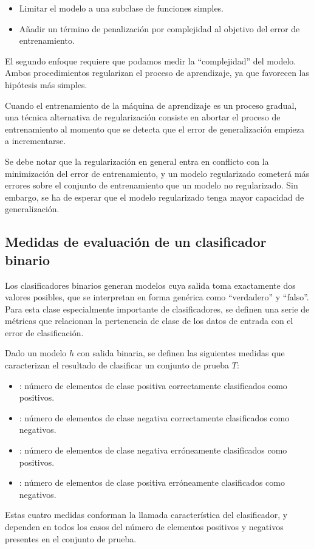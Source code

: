 \begin{itemize}
\item Limitar el modelo a una subclase de funciones simples.
\item Añadir un término de penalización por complejidad al objetivo
  del error de entrenamiento.
\end{itemize}
El segundo enfoque requiere que podamos medir la ``complejidad'' del
modelo. Ambos procedimientos regularizan el proceso de aprendizaje, ya
que favorecen las hipótesis más simples.

Cuando el entrenamiento de la máquina de aprendizaje es un proceso
gradual, una técnica alternativa de regularización consiste en
abortar el proceso de entrenamiento al momento que se detecta
que el error de generalización empieza a incrementarse.

Se debe notar que la regularización en general entra en conflicto con
la minimización del error de entrenamiento, y un modelo regularizado
cometerá más errores sobre el conjunto de entrenamiento que un modelo
no regularizado.  Sin embargo, se ha de esperar que el modelo
regularizado tenga mayor capacidad de generalización.

\subsection{Medidas de evaluación de un clasificador binario}









Los clasificadores binarios generan modelos cuya salida toma
exactamente dos valores posibles, que se interpretan en forma genérica
como ``verdadero'' y ``falso''. Para esta clase especialmente
importante de clasificadores, se definen una serie de métricas que
relacionan la pertenencia de clase de los datos de entrada con el
error de clasificación.

Dado un modelo $h$ con salida binaria, se definen las siguientes
medidas que caracterizan el resultado de clasificar un conjunto de
prueba $T$:

\begin{itemize}
[style=nextline]
  \item{}: número de elementos de clase
    positiva correctamente clasificados como positivos.
  \item{}: número de elementos de clase
    negativa correctamente clasificados como negativos.
  \item{}: número de elementos de clase
    negativa erróneamente clasificados como positivos.
  \item{}: número de elementos de clase
    positiva erróneamente clasificados como negativos.
\end{itemize}
Estas cuatro medidas conforman la llamada 
característica del clasificador, y dependen en todos los casos del
número de elementos positivos y negativos presentes en el conjunto de
prueba.

